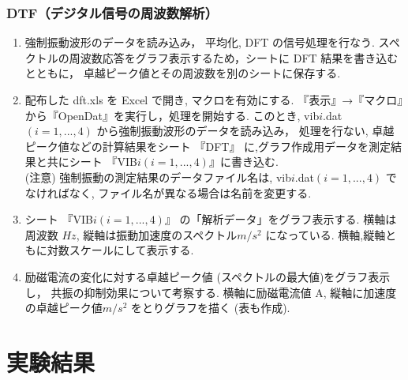 \documentclass[a4paper,10.5pt]{jsarticle}
\begin{document}
\subsubsection{DTF（デジタル信号の周波数解析）}
\begin{enumerate}
  \item 強制振動波形のデータを読み込み， 平均化, DFT の信号処理を行なう. 
  スペクトルの周波数応答をグラフ表示するため，シートに DFT 結果を書き込むとともに，
  卓越ピーク値とその周波数を別のシートに保存する.
  \item 配布した dft.xls を Excel で開き, マクロを有効にする.
  『表示』→『マクロ』から『OpenDat』を実行し，処理を開始する.
  このとき, vib$i$.dat $(i=1,..., 4)$ から強制振動波形のデータを読み込み， 
  処理を行ない, 卓越ピーク値などの計算結果をシート 『DFT』 に,グラフ作成用データを測定結果と共にシート 
  『VIB$i(i=1,...,4)$』に書き込む. \\
  (注意) 強制振動の測定結果のデータファイル名は,
  vib$i$.dat$(i=1,..., 4)$ でなければなく, ファイル名が異なる場合は名前を変更する.
  \item シート 『VIB$i(i=1,..., 4)$』 の「解析データ」をグラフ表示する. 
  横軸は周波数 $Hz$, 縦軸は振動加速度のスペクトル$m/s^2$ になっている. 横軸,縦軸ともに対数スケールにして表示する.
  \item 励磁電流の変化に対する卓越ピーク値 (スペクトルの最大値)をグラフ表示し，
  共振の抑制効果について考察する. 横軸に励磁電流値 A, 縦軸に加速度の卓越ピーク値$m/s^2$ をとりグラフを描く (表も作成).
\end{enumerate}
\section{実験結果}
\end{document}

